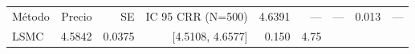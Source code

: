 \begin{tabular}{p{3.3cm}rrrrr}
\toprule
Método & Precio & SE & IC 95%
\midrule
CRR (N=500) & 4.6391 & --- & --- & 0.013 & --- \\
LSMC & 4.5842 & 0.0375 & [4.5108, 4.6577] & 0.150 & 4.75 \\
\bottomrule
\end{tabular}
